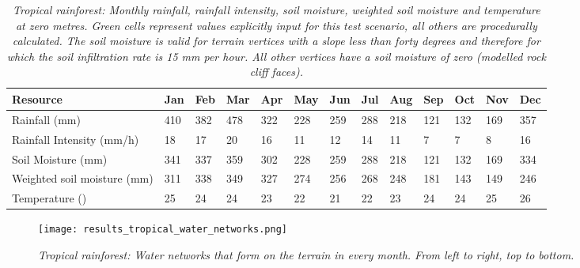 \begin{table}[htb!]
  \centering
	    \begin{tabular}{|p{3cm}|p{.7cm}|p{.7cm}|p{.7cm}|p{.7cm}|p{.7cm}|p{.7cm}|p{.7cm}|p{.7cm}|p{.7cm}|p{.7cm}|p{.7cm}|p{.7cm}|}
		\hline	
  	    \textbf{Resource} & \textbf{Jan} & \textbf{Feb} & \textbf{Mar} & \textbf{Apr} & \textbf{May} & \textbf{Jun} & \textbf{Jul} & \textbf{Aug} & \textbf{Sep} & \textbf{Oct} & \textbf{Nov} & \textbf{Dec} \\
  	    \hline	
		Rainfall (mm) & \cellcolor{green}410 & \cellcolor{green}382 & \cellcolor{green}478 & \cellcolor{green}322 & \cellcolor{green}228 & \cellcolor{green}259 & \cellcolor{green}288 & \cellcolor{green}218 & \cellcolor{green}121 & \cellcolor{green}132 & \cellcolor{green}169 & \cellcolor{green}357  \\
		\hline
		Rainfall Intensity (mm/h) & \cellcolor{green}18 & \cellcolor{green}17 & \cellcolor{green}20 & \cellcolor{green}16 & \cellcolor{green}11 & \cellcolor{green}12 & \cellcolor{green}14 & \cellcolor{green}11 & \cellcolor{green}7 & \cellcolor{green}7 & \cellcolor{green}8 & \cellcolor{green}16  \\
		\hline
		Soil Moisture (mm) & 341 & 337 & 359 & 302 & 228 & 259 & 288 & 218 & 121 & 132 & 169 & 334  \\
		\hline
		Weighted soil moisture (mm)	& 311 & 338	& 349 & 327 & 274 & 256 & 268 & 248 & 181 & 143 & 149 & 246 \\
		\hline
		Temperature (\textdegree) & 25 & 24 & 24 & 23 & 22 & \cellcolor{green}21 & 22 & 23 & 24 & 24 & 25 & \cellcolor{green}26  \\
		\hline
		\end{tabular}
		\caption{\textit{Tropical rainforest: Monthly rainfall, rainfall intensity, soil moisture, weighted soil moisture and temperature at zero metres. Green cells represent values explicitly input for this test scenario, all others are procedurally calculated. The soil moisture is valid for terrain vertices with a slope less than forty degrees and therefore for which the soil infiltration rate is 15 mm per hour. All other vertices have a soil moisture of zero (modelled rock cliff faces).}}
	  \label{tab:results_tropical_input_resources}
\end{table}

\begin{figure}[htb!]
\center
	\texttt{[image: results\_tropical\_water\_networks.png]}
	\caption{ \textit{Tropical rainforest: Water networks that form on the terrain in every month. From left to right, top to bottom.}}
	\label{fig:results_tropical_water_networks}
\end{figure}

